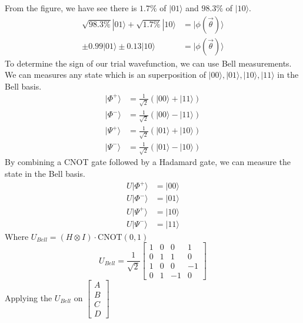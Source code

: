 \documentclass{article}
\begin{document}
\begin{itemize}
	      From the figure, we have see there is \(1.7 \% \) of \(|01\rangle\) and \(98.3 \%\) of \(|10\rangle\).
	      \begin{align*}
		      \sqrt{98.3 \%}|01\rangle +\sqrt{1.7 \% } |10\rangle & = |\phi(\vec{\theta}) \rangle \\
		      \pm 0.99 |01\rangle \pm 0.13 |10\rangle             & = |\phi(\vec{\theta}) \rangle
	      \end{align*}
	      To determine the sign of our trial wavefunction, we can use Bell measurements. We can measures any state which is an superposition of \(|00\rangle, |01\rangle, |10\rangle , |11\rangle\) in the Bell basis.
	      \begin{align*}
		      |\Phi^+\rangle & = \frac{1}{\sqrt{2}}(|00\rangle + |11\rangle) \\
		      |\Phi^-\rangle & = \frac{1}{\sqrt{2}}(|00\rangle - |11\rangle) \\
		      |\Psi^+\rangle & = \frac{1}{\sqrt{2}}(|01\rangle + |10\rangle) \\
		      |\Psi^-\rangle & = \frac{1}{\sqrt{2}}(|01\rangle - |10\rangle)
	      \end{align*}
	      By combining a CNOT gate followed by a Hadamard gate, we can measure the state in the Bell basis.
	      \begin{align*}
		      U |\Phi^+\rangle & = |00\rangle \\
		      U |\Phi^-\rangle & = |01\rangle \\
		      U |\Psi^+\rangle & = |10\rangle \\
		      U |\Psi^-\rangle & = |11\rangle
	      \end{align*}
	      Where \(U_{Bell} = \left( H \otimes I \right) \cdot \text{CNOT}(0,1)\)
	      \begin{equation*}
		      U_{Bell} = \frac{1}{\sqrt{2}}\begin{bmatrix}
			      1 & 0 & 0  & 1  \\
			      0 & 1 & 1  & 0  \\
			      1 & 0 & 0  & -1 \\
			      0 & 1 & -1 & 0
		      \end{bmatrix}
	      \end{equation*}
	      Applying the \(U_{Bell}\) on \(\begin{bmatrix}
		      A \\
		      B \\
		      C \\
		      D
	      \end{bmatrix}\)

\end{itemize}
\end{document}
